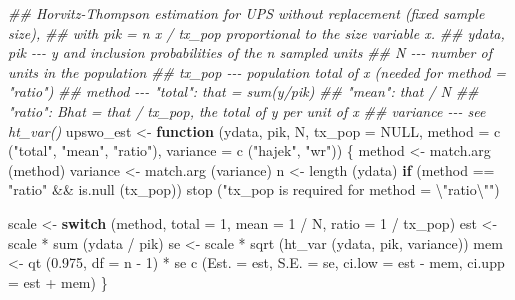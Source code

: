 \documentclass[
  letterpaper,
  DIV=11,
  numbers=noendperiod]{scrreprt}
\newenvironment{Shaded}{\begin{snugshade}}{\end{snugshade}}
\newcommand{\AttributeTok}[1]{\textcolor[rgb]{0.40,0.45,0.13}{#1}}
\newcommand{\ConstantTok}[1]{\textcolor[rgb]{0.56,0.35,0.01}{#1}}
\newcommand{\ControlFlowTok}[1]{\textcolor[rgb]{0.00,0.23,0.31}{\textbf{#1}}}
\newcommand{\DecValTok}[1]{\textcolor[rgb]{0.68,0.00,0.00}{#1}}
\newcommand{\DocumentationTok}[1]{\textcolor[rgb]{0.37,0.37,0.37}{\textit{#1}}}
\newcommand{\FloatTok}[1]{\textcolor[rgb]{0.68,0.00,0.00}{#1}}
\newcommand{\FunctionTok}[1]{\textcolor[rgb]{0.28,0.35,0.67}{#1}}
\newcommand{\NormalTok}[1]{\textcolor[rgb]{0.00,0.23,0.31}{#1}}
\newcommand{\OtherTok}[1]{\textcolor[rgb]{0.00,0.23,0.31}{#1}}
\newcommand{\SpecialCharTok}[1]{\textcolor[rgb]{0.37,0.37,0.37}{#1}}
\newcommand{\StringTok}[1]{\textcolor[rgb]{0.13,0.47,0.30}{#1}}
\renewcommand{\[}{\begin{equation}}
\renewcommand{\]}{\end{equation}}
\begin{document}
\begin{Shaded}
\begin{Highlighting}[]
\DocumentationTok{\#\# Horvitz{-}Thompson estimation for UPS without replacement (fixed sample size),}
\DocumentationTok{\#\# with pik = n x / tx\_pop proportional to the size variable x.}
\DocumentationTok{\#\# ydata, pik {-}{-}{-} y and inclusion probabilities of the n sampled units}
\DocumentationTok{\#\# N {-}{-}{-} number of units in the population}
\DocumentationTok{\#\# tx\_pop {-}{-}{-} population total of x (needed for method = "ratio")}
\DocumentationTok{\#\# method {-}{-}{-} "total": that = sum(y/pik)}
\DocumentationTok{\#\#            "mean": that / N}
\DocumentationTok{\#\#            "ratio": Bhat = that / tx\_pop, the total of y per unit of x}
\DocumentationTok{\#\# variance {-}{-}{-} see ht\_var()}
\NormalTok{upswo\_est }\OtherTok{\textless{}{-}} \ControlFlowTok{function}\NormalTok{ (ydata, pik, N, }\AttributeTok{tx\_pop =} \ConstantTok{NULL}\NormalTok{,}
                       \AttributeTok{method =} \FunctionTok{c}\NormalTok{ (}\StringTok{"total"}\NormalTok{, }\StringTok{"mean"}\NormalTok{, }\StringTok{"ratio"}\NormalTok{),}
                       \AttributeTok{variance =} \FunctionTok{c}\NormalTok{ (}\StringTok{"hajek"}\NormalTok{, }\StringTok{"wr"}\NormalTok{))}
\NormalTok{\{}
\NormalTok{  method }\OtherTok{\textless{}{-}} \FunctionTok{match.arg}\NormalTok{ (method)}
\NormalTok{  variance }\OtherTok{\textless{}{-}} \FunctionTok{match.arg}\NormalTok{ (variance)}
\NormalTok{  n }\OtherTok{\textless{}{-}} \FunctionTok{length}\NormalTok{ (ydata)}
  \ControlFlowTok{if}\NormalTok{ (method }\SpecialCharTok{==} \StringTok{"ratio"} \SpecialCharTok{\&\&} \FunctionTok{is.null}\NormalTok{ (tx\_pop))}
    \FunctionTok{stop}\NormalTok{ (}\StringTok{"tx\_pop is required for method = }\SpecialCharTok{\textbackslash{}"}\StringTok{ratio}\SpecialCharTok{\textbackslash{}"}\StringTok{"}\NormalTok{)}

\NormalTok{  scale }\OtherTok{\textless{}{-}} \ControlFlowTok{switch}\NormalTok{ (method, }\AttributeTok{total =} \DecValTok{1}\NormalTok{, }\AttributeTok{mean =} \DecValTok{1} \SpecialCharTok{/}\NormalTok{ N, }\AttributeTok{ratio =} \DecValTok{1} \SpecialCharTok{/}\NormalTok{ tx\_pop)}
\NormalTok{  est }\OtherTok{\textless{}{-}}\NormalTok{ scale }\SpecialCharTok{*} \FunctionTok{sum}\NormalTok{ (ydata }\SpecialCharTok{/}\NormalTok{ pik)}
\NormalTok{  se }\OtherTok{\textless{}{-}}\NormalTok{ scale }\SpecialCharTok{*} \FunctionTok{sqrt}\NormalTok{ (}\FunctionTok{ht\_var}\NormalTok{ (ydata, pik, variance))}
\NormalTok{  mem }\OtherTok{\textless{}{-}} \FunctionTok{qt}\NormalTok{ (}\FloatTok{0.975}\NormalTok{, }\AttributeTok{df =}\NormalTok{ n }\SpecialCharTok{{-}} \DecValTok{1}\NormalTok{) }\SpecialCharTok{*}\NormalTok{ se}
  \FunctionTok{c}\NormalTok{ (}\AttributeTok{Est. =}\NormalTok{ est, }\AttributeTok{S.E. =}\NormalTok{ se, }\AttributeTok{ci.low =}\NormalTok{ est }\SpecialCharTok{{-}}\NormalTok{ mem, }\AttributeTok{ci.upp =}\NormalTok{ est }\SpecialCharTok{+}\NormalTok{ mem)}
\NormalTok{\}}
\end{Highlighting}
\end{Shaded}
\end{document}
